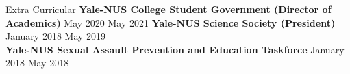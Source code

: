 \begin{rSection}{Extra Curricular}
\textbf{Yale-NUS College Student Government (Director of Academics)} \hfill May 2020 {\textendash}  May 2021
\textbf{Yale-NUS Science Society (President)} \hfill  January 2018 {\textendash}  May 2019 \\
\textbf{Yale-NUS Sexual Assault Prevention and Education Taskforce} \hfill January 2018 {\textendash}  May 2018 
\end{rSection}



